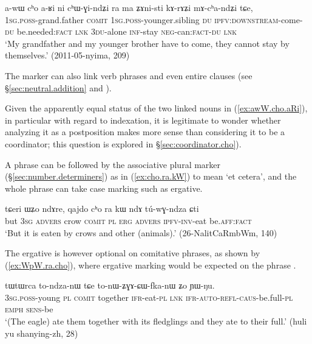 \begin{exe}
\ex \label{ex:awW.cho.aRi}
\gll a-wɯ cʰo a-ʁi ni cʰɯ-ɣi-ndʑi ra ma ʑɤni-sti kɤ-rɤʑi mɤ-cʰa-ndʑi tɕe, \\
\textsc{1sg}.\textsc{poss}-grand.father \textsc{comit} \textsc{1sg}.\textsc{poss}-younger.sibling \textsc{du} \textsc{ipfv}:\textsc{downstream}-come-\textsc{du} be.needed:\textsc{fact} \textsc{lnk} \textsc{3du}-alone \textsc{inf}-stay \textsc{neg}-can:\textsc{fact}-\textsc{du} \textsc{lnk} \\ 
\glt `My grandfather and my younger brother have to come, they cannot stay by themselves.' (2011-05-nyima, 209)
\end{exe}

The marker  can also link verb phrases and even entire clauses (see §\ref{sec:neutral.addition} and \citealt[313]{jacques14linking}).

Given the apparently equal status of the two linked nouns in (\ref{ex:awW.cho.aRi}), in particular with regard to indexation, it is legitimate to wonder whether analyzing it as a postposition makes more sense than considering it to be a coordinator; this question is explored in §\ref{sec:coordinator.cho}). 

A  phrase can be followed by the associative plural marker  (§\ref{sec:number.determiners}) as in (\ref{ex:cho.ra.kW}) to mean `et cetera', and the whole phrase can take case marking such as ergative.

\begin{exe}
\ex \label{ex:cho.ra.kW}
\gll tɕeri ɯʑo ndɤre, qajdo cʰo ra kɯ ndɤ tú-wɣ-ndza ɕti \\
but \textsc{3sg} \textsc{advers} crow \textsc{comit} \textsc{pl} \textsc{erg} \textsc{advers} \textsc{ipfv}-\textsc{inv}-eat be.\textsc{aff}:\textsc{fact} \\
\glt `But it is eaten by crows and other (animals).' (26-NalitCaRmbWm, 140)
\end{exe}

The ergative  is however optional on comitative phrases, as shown by (\ref{ex:WpW.ra.cho}), where ergative marking would be expected on the phrase .

\begin{exe}
\ex \label{ex:WpW.ra.cho}
\gll [ɯ-pɯ ra cʰo] tɯtɯrca to-ndza-nɯ tɕe to-nɯ-ʑɣɤ-ɕɯ-fka-nɯ ʑo ɲɯ-ŋu. \\
\textsc{3sg}.\textsc{poss}-young \textsc{pl} \textsc{comit} together \textsc{ifr}-eat-\textsc{pl} \textsc{lnk} \textsc{ifr}-\textsc{auto}-\textsc{refl}-\textsc{caus}-be.full-\textsc{pl} \textsc{emph} \textsc{sens}-be \\
\glt `(The eagle) ate them together with its fledglings and they ate to their full.' (huli yu shanying-zh, 28)
\end{exe}

